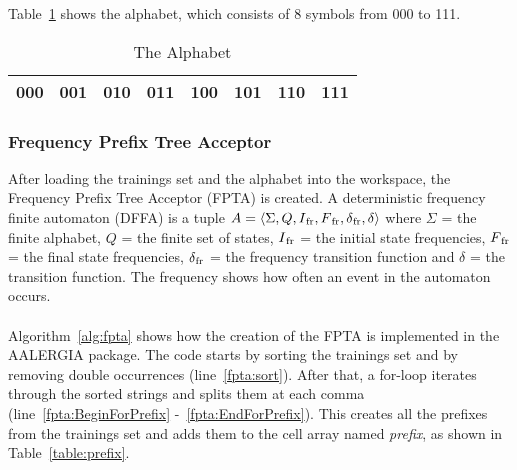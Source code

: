 \documentclass[
a4paper,     %
12pt         %
]{scrartcl}  %
\begin{document}
Table~\ref{table:alphabet} shows the alphabet, which consists of 8 symbols from 000 to 111.

\begin{table}[ht!]
\centering
\begin{tabular}{|l|l|l|l|l|l|l|l|}
\hline
000 & 001 & 010 & 011 & 100 & 101 & 110 & 111 \\ \hline
\end{tabular}
\caption{The Alphabet} 
\label{table:alphabet}
\end{table}

\subsubsection{Frequency Prefix Tree Acceptor}
After loading the trainings set and the alphabet into the workspace, the Frequency Prefix Tree Acceptor (FPTA) is created. A deterministic frequency finite automaton (DFFA) is a tuple $A = \langle \Sigma, Q, I\textsubscript{fr}, F\textsubscript{fr}, \delta\textsubscript{fr}, \delta \rangle$ where $ \Sigma $ = the finite alphabet, $Q$ = the finite set of states, $I\textsubscript{fr}$ = the initial state frequencies, $F\textsubscript{fr}$ = the final state frequencies, $\delta\textsubscript{fr}$ = the frequency transition function and $ \delta$ = the transition function. The frequency shows how often an event in the automaton occurs.
\paragraph{}
Algorithm~\ref{alg:fpta} shows how the creation of the FPTA is implemented in the AALERGIA package. The code starts by sorting the trainings set and by removing double occurrences (line~\ref{fpta:sort}). 
After that, a for-loop iterates through the sorted strings and splits them at each comma (line~\ref{fpta:BeginForPrefix} -~\ref{fpta:EndForPrefix}). 
This creates all the prefixes from the trainings set and adds them to the cell array named \emph{prefix}, as shown in Table~\ref{table:prefix}.
\end{document}
